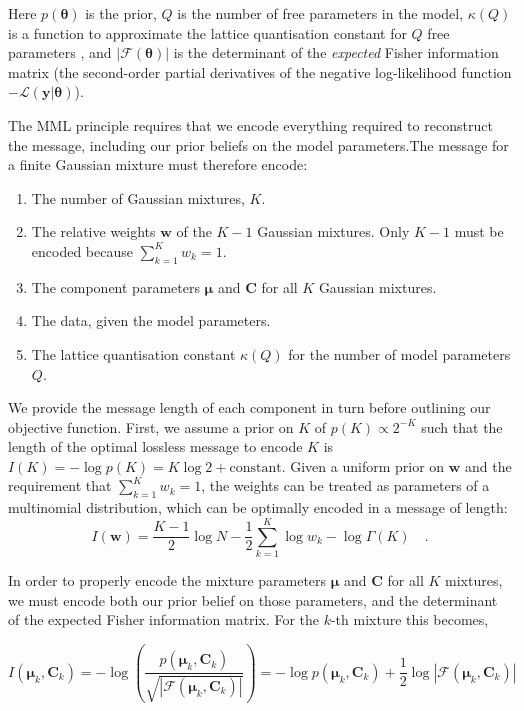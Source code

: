 \documentclass{article}
\newcommand{\vect}[1]{\boldsymbol{\mathbf{#1}}}
\def\veccov{\vect{C}}
\def\vecmean{\vect{\mu}}
\def\vectheta{\vect{\theta}}
\def\weight{w}
\def\weights{\vect{\weight}}
\def\datum{y}
\def\data{\vect{\datum}}
\def\likelihood{\mathcal{L}}
\begin{document}
Here $p(\vectheta)$ is the prior, $Q$ is the number of free parameters in the
model, $\kappa\left(Q\right)$ is a function to approximate the lattice
quantisation constant for $Q$ free parameters \citep[e.g.,][]{Conway_1984}, 
and $|\mathcal{F}\left(\vectheta\right)|$ is the determinant of the 
\emph{expected} Fisher information matrix (the second-order partial 
derivatives of the negative log-likelihood function 
$-\likelihood(\data|\vectheta)$).


The MML principle requires that we encode everything required to reconstruct
the message, including our prior beliefs on the model parameters.The message 
for a finite Gaussian mixture must therefore encode:
\begin{enumerate}
  \item The number of Gaussian mixtures, $K$.
  \item The relative weights $\weights$ of the $K - 1$ Gaussian mixtures. Only
        $K - 1$ must be encoded because $\sum_{k=1}^{K}\weight_k = 1$.
  \item The component parameters $\vecmean$ and $\veccov$ for all $K$ Gaussian
        mixtures.
  \item The data, given the model parameters.
  \item The lattice quantisation constant $\kappa(Q)$ for the number of model
        parameters $Q$.
\end{enumerate}

We provide the message length of each component in turn before outlining our
objective function.  First, we assume a prior on $K$ of $p(K) \propto 2^{-K}$
such that the length of the optimal lossless message to encode $K$ is 
$I(K) = -\log{p(K)} = K\log{2} + \textrm{constant}$.  Given a uniform prior
on $\weights$ and the requirement that $\sum_{k=1}^{K}\weight_k = 1$, the 
weights can be treated as parameters of a multinomial distribution, which can
be optimally encoded in a message of length:
\begin{equation}
  I(\weights) 
    = \frac{K - 1}{2}\log{N} 
    - \frac{1}{2}\sum_{k=1}^{K}\log\weight_k 
    - \log{\Gamma{\left(K\right)}} \quad .
\end{equation}

In order to properly encode the mixture parameters $\vecmean$ and $\veccov$
for all $K$ mixtures, we must encode both our prior belief on those parameters,
and the determinant of the expected Fisher information matrix. For the $k$-th
mixture this becomes,

\begin{equation}
  I(\vecmean_k,\veccov_k) = -\log{\left(\frac{p(\vecmean_k,\veccov_k)}{\sqrt{|\mathcal{F}\left(\vecmean_k,\veccov_k\right)|}}\right)}
                          = -\log{p(\vecmean_k,\veccov_k)} + \frac{1}{2}\log{|\mathcal{F}\left(\vecmean_k,\veccov_k\right)|}
\end{equation}
\end{document}
